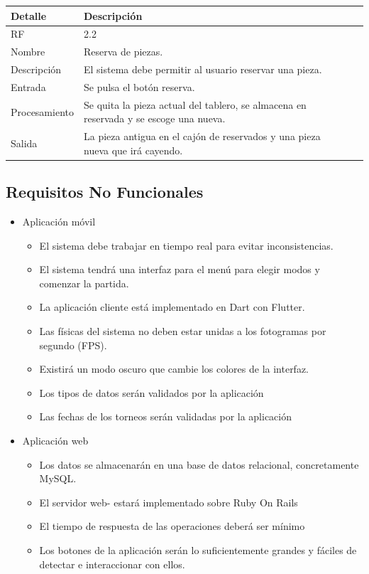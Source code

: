 \documentclass{article}
\begin{document}
\begin{table}[H]
  \begin{center}
    \begin{tabularx}{\linewidth}{|X|X|X|} %
      \hline
      \textbf{Detalle} & \textbf{Descripción}\\
      \hline
      RF & 2.2 \\
      \hline
      Nombre & Reserva de piezas.\\
      \hline
      Descripción & El sistema debe permitir al usuario reservar una pieza.\\
      \hline
      Entrada & Se pulsa el botón reserva.\\
      \hline
      Procesamiento & Se quita la pieza actual del tablero, se almacena en reservada y se escoge una nueva.\\
      \hline
      Salida & La pieza antigua en el cajón de reservados y una pieza nueva que irá cayendo.\\
      \hline
    \end{tabularx}
  \end{center}
\end{table}

\subsection{Requisitos No Funcionales}
\begin{itemize}
  \item Aplicación móvil
  \begin{itemize}
    \item El sistema debe trabajar en tiempo real para evitar inconsistencias.
    \item El sistema tendrá una interfaz para el menú para elegir modos y comenzar la partida.
    \item La aplicación cliente está implementado en Dart con Flutter.
    \item Las físicas del sistema no deben estar unidas a los fotogramas por segundo (FPS).
    \item Existirá un modo oscuro que cambie los colores de la interfaz.
    \item Los tipos de datos serán validados por la aplicación 
    \item Las fechas de los torneos serán validadas por la aplicación
  \end{itemize}
  \item Aplicación web
  \begin{itemize}
    \item Los datos se almacenarán en una base de datos relacional, concretamente MySQL.
    \item El servidor web- estará implementado sobre Ruby On Rails
    \item El tiempo de respuesta de las operaciones deberá ser mínimo
    \item Los botones de la aplicación serán lo suficientemente grandes y fáciles de detectar e interaccionar con ellos.
\end{itemize}
\end{itemize}
\end{document}
